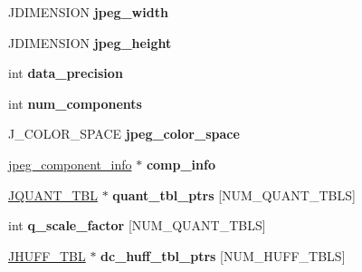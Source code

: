 \begin{DoxyCompactItemize}
\mbox{\label{structjpeg__compress__struct_ab433b317fcbe32212122621e476ac9d8}} 
J\+D\+I\+M\+E\+N\+S\+I\+ON {\bfseries jpeg\+\_\+width}
\item 
\mbox{\label{structjpeg__compress__struct_abc2cf065c0faab28327f7238949f76d3}} 
J\+D\+I\+M\+E\+N\+S\+I\+ON {\bfseries jpeg\+\_\+height}
\item 
\mbox{\label{structjpeg__compress__struct_a64c5b59e436f7d3d1d38b58d49993469}} 
int {\bfseries data\+\_\+precision}
\item 
\mbox{\label{structjpeg__compress__struct_a524f0284a6fcf96b21c8a745282c15e2}} 
int {\bfseries num\+\_\+components}
\item 
\mbox{\label{structjpeg__compress__struct_a7fb5305ec135340eddc2ebabec6a84d7}} 
J\+\_\+\+C\+O\+L\+O\+R\+\_\+\+S\+P\+A\+CE {\bfseries jpeg\+\_\+color\+\_\+space}
\item 
\mbox{\label{structjpeg__compress__struct_ac68dd6e6b3ff7c358ebfa7f166ee6d55}} 
\hyperlink{structjpeg__component__info}{jpeg\+\_\+component\+\_\+info} $\ast$ {\bfseries comp\+\_\+info}
\item 
\mbox{\label{structjpeg__compress__struct_a46a71a5c527558d788e442d5b40aebc2}} 
\hyperlink{structJQUANT__TBL}{J\+Q\+U\+A\+N\+T\+\_\+\+T\+BL} $\ast$ {\bfseries quant\+\_\+tbl\+\_\+ptrs} \mbox{[}N\+U\+M\+\_\+\+Q\+U\+A\+N\+T\+\_\+\+T\+B\+LS\mbox{]}
\item 
\mbox{\label{structjpeg__compress__struct_a0fee6bbbc998cfa543e77aad28f47911}} 
int {\bfseries q\+\_\+scale\+\_\+factor} \mbox{[}N\+U\+M\+\_\+\+Q\+U\+A\+N\+T\+\_\+\+T\+B\+LS\mbox{]}
\item 
\mbox{\label{structjpeg__compress__struct_a32ccb497e8198386c473d43223585ae5}} 
\hyperlink{structJHUFF__TBL}{J\+H\+U\+F\+F\+\_\+\+T\+BL} $\ast$ {\bfseries dc\+\_\+huff\+\_\+tbl\+\_\+ptrs} \mbox{[}N\+U\+M\+\_\+\+H\+U\+F\+F\+\_\+\+T\+B\+LS\mbox{]}
\item 

\end{DoxyCompactItemize}
